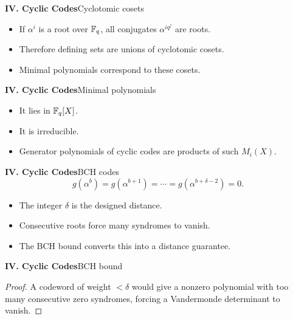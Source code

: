 \begin{frame}{\textbf{IV. Cyclic Codes}}{Cyclotomic cosets}
\small
{}
\begin{itemize}
  \item If $\alpha^i$ is a root over $\mathbb{F}_q$, all conjugates $\alpha^{iq^j}$ are roots.
  \item Therefore defining sets are unions of cyclotomic cosets.
  \item Minimal polynomials correspond to these cosets.
\end{itemize}
\end{frame}

\begin{frame}{\textbf{IV. Cyclic Codes}}{Minimal polynomials}
\small
{}
\begin{itemize}
  \item It lies in $\mathbb{F}_q[X]$.
  \item It is irreducible.
  \item Generator polynomials of cyclic codes are products of such $M_i(X)$.
\end{itemize}
\end{frame}

\begin{frame}{\textbf{IV. Cyclic Codes}}{BCH codes}
\small
{}
\[
  g(\alpha^b)=g(\alpha^{b+1})=\cdots=g(\alpha^{b+\delta-2})=0.
\]
\begin{itemize}
  \item The integer $\delta$ is the designed distance.
  \item Consecutive roots force many syndromes to vanish.
  \item The BCH bound converts this into a distance guarantee.
\end{itemize}
\end{frame}

\begin{frame}{\textbf{IV. Cyclic Codes}}{BCH bound}
\small
{}
\begin{proof}
A codeword of weight $<\delta$ would give a nonzero polynomial with too many consecutive zero syndromes, forcing a Vandermonde determinant to vanish.
\end{proof}
\end{frame}

